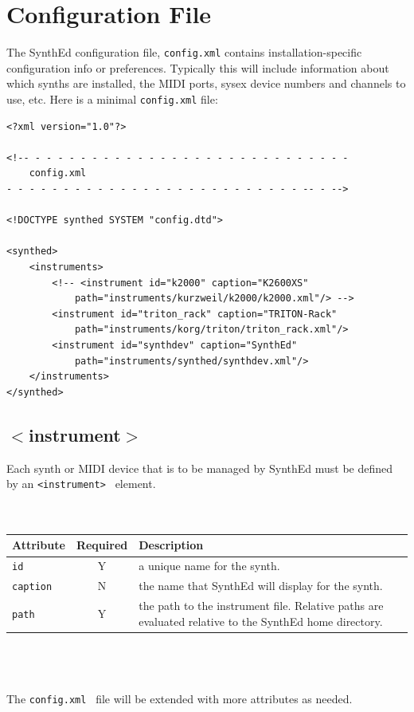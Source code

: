 \documentclass[a4paper,twoside,12pt]{article}
\newcommand{\code}[1]{\color{red}\texttt{#1}\color{black}}
\begin{document}
\section{Configuration File}\label{config_file}
The SynthEd configuration file, \code{config.xml}{} contains
installation-specific configuration info or preferences. Typically
this will include information about which synths are installed,
the MIDI ports, sysex device numbers and channels to use, etc.
Here is a minimal \code{config.xml}{} file:

\begin{verbatim}
<?xml version="1.0"?>

<!-- - - - - - - - - - - - - - - - - - - - - - - - - - - - -
    config.xml
- - - - - - - - - - - - - - - - - - - - - - - - - - -- - -->

<!DOCTYPE synthed SYSTEM "config.dtd">

<synthed>
    <instruments>
        <!-- <instrument id="k2000" caption="K2600XS"
            path="instruments/kurzweil/k2000/k2000.xml"/> -->
        <instrument id="triton_rack" caption="TRITON-Rack"
            path="instruments/korg/triton/triton_rack.xml"/>
        <instrument id="synthdev" caption="SynthEd"
            path="instruments/synthed/synthdev.xml"/>
    </instruments>
</synthed>
\end{verbatim}

\subsection{$<$instrument$>$}
Each synth or MIDI device that is to be managed by SynthEd must be
defined by an \code{<instrument> } element.
\\
\\
\\
\begin{tabular}{|l|c|p{9cm}|}
\hline
Attribute & Required & Description \\
\hline
\code{id} & Y & a unique name for the synth. \\
\code{caption} & N & the name that SynthEd will display for the synth. \\
\code{path} & Y & the path to the instrument file. Relative paths
are evaluated relative to the SynthEd home directory. \\
\hline
\end{tabular}
\\
\\
\\
The \code{config.xml } file will be extended with more attributes
as needed.
\end{document}
